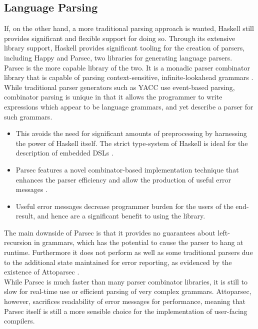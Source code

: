 
\subsection{Language Parsing} %
\label{sub:language_parsing}
If, on the other hand, a more traditional parsing approach is wanted, Haskell still provides significant and flexible support for doing so. 
Through its extensive library support, Haskell provides significant tooling for the creation of parsers, including Happy and Parsec, two libraries for generating language parsers. \\

Parsec is the more capable library of the two.
It is a monadic parser combinator library that is capable of parsing context-sensitive, infinite-lookahead grammars \citep{leijen2001parsec}.
While traditional parser generators such as YACC use event-based parsing, combinator parsing is unique in that it allows the programmer to write expressions which appear to be language grammars, and yet describe a parser for such grammars.
\begin{itemize}
    \item This avoids the need for significant amounts of preprocessing by harnessing the power of Haskell itself. 
    The strict type-system of Haskell is ideal for the description of embedded DSLs \citep{swierstra2009combinator}.
    \item Parsec features a novel combinator-based implementation technique that enhances the parser efficiency and allow the production of useful error messages \citep{leijen2002parsec}.
    \item Useful error messages decrease programmer burden for the users of the end-result, and hence are a significant benefit to using the library. 
\end{itemize}

The main downside of Parsec is that it provides no guarantees about left-recursion in grammars, which has the potential to cause the parser to hang at runtime. 
Furthermore it does not perform as well as some traditional parsers due to the additional state maintained for error reporting, as evidenced by the existence of Attoparsec \citep{gummelt2011hindsight}. \\

While Parsec is much faster than many parser combinator libraries, it is still to slow for real-time use or efficient parsing of very complex grammars. 
Attoparsec, however, sacrifices readability of error messages for performance, meaning that Parsec itself is still a more sensible choice for the implementation of user-facing compilers. \\

